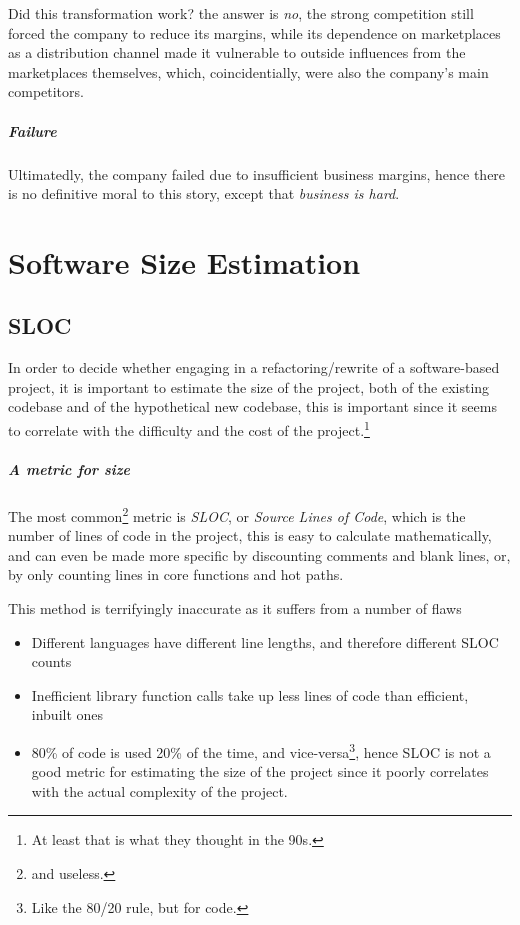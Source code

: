 \documentclass[openright, twoside, twocolumn, a4paper, 10pt]{report}
\begin{document}
Did this transformation work? the answer is \emph{no}, the strong competition still forced the
company to reduce its margins, while its dependence on marketplaces as a distribution channel made it vulnerable to
outside influences from the marketplaces themselves, which, coincidentially, were also the company's main competitors.

\paragraph{Failure}
Ultimatedly, the company failed due to insufficient business margins, hence there is no
definitive moral to this story, except that \emph{business is hard}.


\chapter{Software Size Estimation}


\section{SLOC}
In order to decide whether engaging in a refactoring/rewrite of a software-based project, it is important to estimate the size of the project,
both of the existing codebase and of the hypothetical new codebase, this is important since it seems to correlate with the difficulty
and the cost of the project.\footnote{
	At least that is what they thought in the 90s.
}

\paragraph{A metric for size}

The most common\footnote{and useless.} metric is \emph{SLOC}, or \emph{Source Lines of Code}, which is the number of lines of code in the project,
this is easy to calculate mathematically, and can even be made more specific by discounting comments and blank lines, or, by only
counting lines in core functions and hot paths.

This method is terrifyingly inaccurate as it suffers from a number of flaws
\begin{itemize}
	\item Different languages have different line lengths, and therefore different SLOC counts
	\item Inefficient library function calls take up less lines of code than efficient, inbuilt ones
	\item 80\% of code is used 20\% of the time, and vice-versa\footnote{
		      Like the 80/20 rule, but for code.
	      }, hence SLOC is not a good metric for estimating the size of the project since it poorly correlates with the actual complexity of the project.
\end{itemize}
\end{document}
